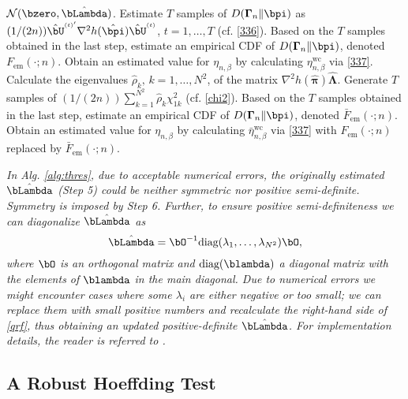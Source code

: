 \documentclass[10pt, twocolumn]{IEEEtran}
\begin{document}
\begin{algorithm}
\begin{algorithmic}[1]
{$\mathcal{N}( {\bzero, \hat{\bLambda} } )$. 
\STATE Estimate $T$ samples of ${D}({{\boldsymbol{\Gamma} _n}\| {\bpi} })$ as 
$(1/(2n)) {\hat {\bU}^{\scriptscriptstyle{( t )}'}} {\nabla ^2}h( {\hat
  {{\bpi}} }) {\hat {\bU}^{\scriptscriptstyle{( t )}}}$, $t = 1, \ldots
,T$ (cf. \eqref{336}). 
\STATE Based on the $T$ samples obtained in the last step, estimate an
empirical CDF of ${D}({{\boldsymbol{\Gamma} _n}\| {{{\bpi}}} })$,
denoted ${F_{\text{em}}}( \cdot; n )$. 
\STATE Obtain an estimated value for $\eta_{n,\beta}$ by calculating
$\eta_{n,\beta}^{\text{wc}}$ via \eqref{337}. 
\STATE Calculate the eigenvalues $\hat \rho_k, \, k = 1, \ldots, N^2$, of the matrix ${\nabla ^2}h( \hat{\boldsymbol{\pi}} )\hat {\boldsymbol{\Lambda}}$. 
\STATE Generate $T$ samples of $(1/(2n))\sum\nolimits_{k = 1}^{{N^2}} {{\hat \rho _k}\chi _{1k}^2}$ (cf. \eqref{chi2}). 
\STATE Based on the $T$ samples obtained in the last step, estimate an
empirical CDF of ${D}({{\boldsymbol{\Gamma} _n}\| {{{\bpi}}} })$,
denoted  ${\bar F_{\text{em}}}( \cdot; n )$. 
\STATE Obtain an estimated value for $\eta_{n,\beta}$ by calculating
$\bar \eta_{n,\beta}^{\text{wc}}$ via \eqref{337} with
$F_{\text{em}}(\cdot; n)$ replaced by $\bar F_{\text{em}}(\cdot; n)$.
\ENDIF}
\end{algorithmic}
\end{algorithm}


\begin{rem} \label{rem:alg} \emph{In Alg. \ref{alg:thres}, due to
    acceptable numerical errors, the originally estimated $\hat{\bLambda}$
    (Step 5) could be neither symmetric nor positive
    semi-definite. Symmetry is imposed by Step 6. Further, to ensure
    positive semi-definiteness we can diagonalize $\hat
    \bLambda$ as
\begin{equation}
\hat {\bLambda}  = {{\bO}^{ - 1}}  \text{diag}(\lambda_1,\ldots, \lambda _{N^2}) 
\bO, \label{qrf}
\end{equation}
where $\bO$ is an orthogonal matrix and $\text{diag}(\blambda)$ a
diagonal matrix with the elements of $\blambda$ in the main diagonal.
Due to numerical errors we might encounter cases where some $\lambda_i$
are either negative or too small; we can replace them with small
positive numbers and recalculate the right-hand side of \eqref{qrf},
thus obtaining an updated positive-definite $\hat \bLambda$.  For
implementation details, the reader is referred to \cite{TAHTMA}.  }
\end{rem}

\subsection{A Robust Hoeffding Test}
\end{document}
